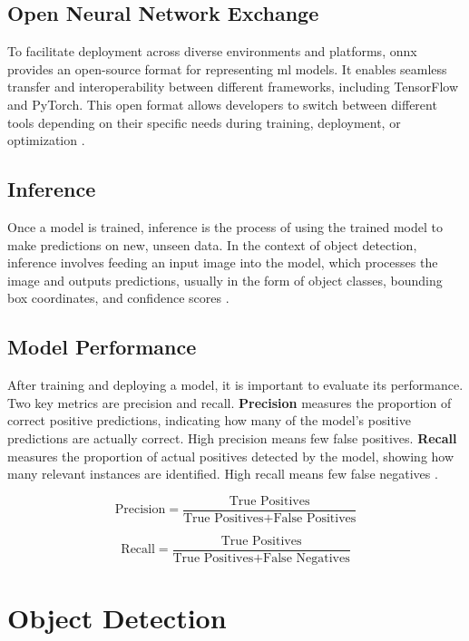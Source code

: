 \subsection{Open Neural Network Exchange}

To facilitate deployment across diverse environments and platforms, \gls{onnx} provides an open-source format for representing \gls{ml} models. It enables seamless transfer and interoperability between different frameworks, including TensorFlow and PyTorch. This open format allows developers to switch between different tools depending on their specific needs during training, deployment, or optimization \cite{roboflow:onnx}.\\

\subsection{Inference}

Once a model is trained, inference is the process of using the trained model to make predictions on new, unseen data. In the context of object detection, inference involves feeding an input image into the model, which processes the image and outputs predictions, usually in the form of object classes, bounding box coordinates, and confidence scores \cite{nvidia:inference}. \\

\newpage

\subsection{Model Performance}

After training and deploying a model, it is important to evaluate its performance. Two key metrics are precision and recall. \textbf{Precision} measures the proportion of correct positive predictions, indicating how many of the model’s positive predictions are actually correct. High precision means few false positives. \textbf{Recall} measures the proportion of actual positives detected by the model, showing how many relevant instances are identified. High recall means few false negatives \cite{builtin:precision-recall}.

\[
\text{Precision} = \frac{\text{True Positives}}{\text{True Positives} + \text{False Positives}}
\]

\[
\text{Recall} = \frac{\text{True Positives}}{\text{True Positives} + \text{False Negatives}}
\]

\section{Object Detection}
\label{sec:object-detection}

